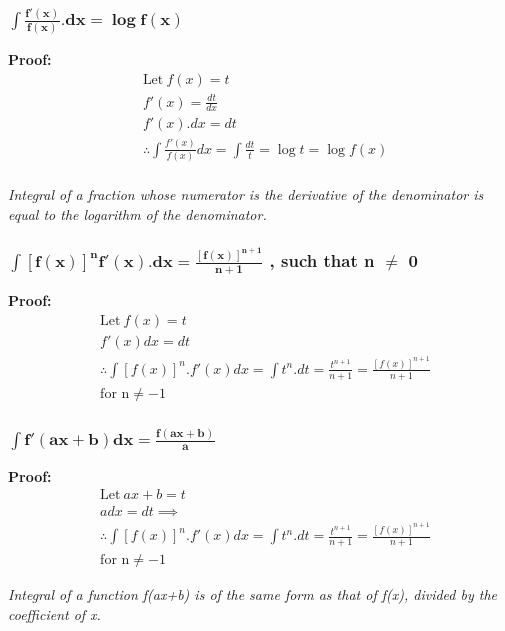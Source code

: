 \subsubsection{$ \mathbf{\int \frac{f'(x)}{f(x)}.dx = \log{f(x)}} $}

\noindent
\textbf{Proof:}
\begin{align*}
&\text{Let} \: f(x) = t \\
&f'(x) = \frac{dt}{dx} \\
&f'(x).dx = dt \\
&\therefore \int \frac{f'(x)}{f(x)}dx = \int \frac{dt}{t} = \log t = \log f(x) \\
\end{align*}

\noindent
\textit{Integral of a fraction whose numerator is the derivative of the denominator is equal to the logarithm of the denominator.}


\subsubsection{$ \mathbf{\int [f(x)]^n f'(x).dx = \frac{[f(x)]^{n+1}}{n+1}}$ , such that n $\neq$ 0}

\noindent
\textbf{Proof:}
\begin{align*}
&\text{Let} \: f(x) = t \\
&f'(x)dx = dt \\
&\therefore \int [f(x)]^n.f'(x)dx = \int t^n.dt = \frac{t^{n+1}}{n+1} = \frac{[f(x)]^{n+1}}{n+1} \\ 
&\text{for n} \neq -1
\end{align*}

\subsubsection{$ \mathbf{\int f'(ax+b)dx = \frac{f(ax+b)}{a}}$}
\noindent
\textbf{Proof:}
\begin{align*}
&\text{Let} \: ax+b = t \\
&adx = dt \implies \\
&\therefore \int [f(x)]^n.f'(x)dx = \int t^n.dt = \frac{t^{n+1}}{n+1} = \frac{[f(x)]^{n+1}}{n+1} \\ 
&\text{for n} \neq -1
\end{align*}

\noindent
\textit{Integral of a function f(ax+b) is of the same form as that of f(x), divided by the coefficient of x.}
